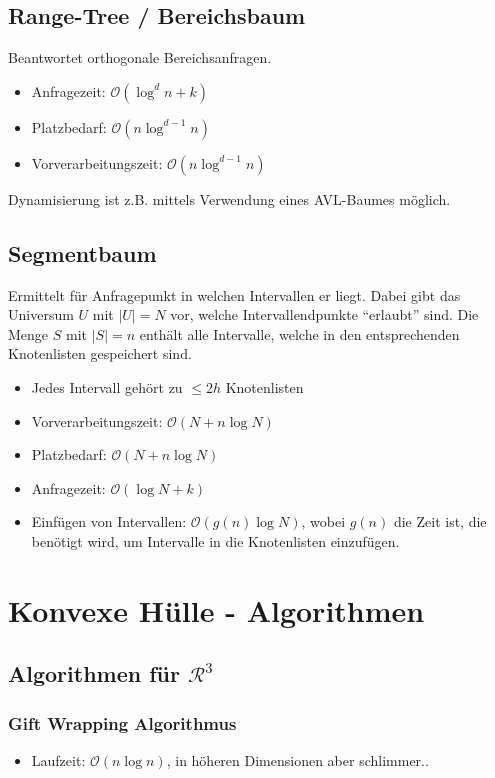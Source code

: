 \documentclass[a4paper]{article}
\begin{document}
\subsection*{Range-Tree / Bereichsbaum}
Beantwortet orthogonale Bereichsanfragen.
\begin{itemize}
	\item Anfragezeit: $\mathcal{O}(\log^d n + k)$
	\item Platzbedarf: $\mathcal{O}(n \log^{d-1} n)$
	\item Vorverarbeitungszeit: $\mathcal{O}(n \log^{d-1} n)$
\end{itemize}
Dynamisierung ist z.B. mittels Verwendung eines AVL-Baumes möglich.
\subsection*{Segmentbaum}
Ermittelt für Anfragepunkt in welchen Intervallen er liegt.
Dabei gibt das Universum $U$ mit $|U| = N$ vor, welche Intervallendpunkte "`erlaubt"' sind.
Die Menge $S$ mit $|S| = n$ enthält alle Intervalle, welche in den entsprechenden Knotenlisten
 gespeichert sind.
\begin{itemize}
	\item Jedes Intervall gehört zu $\leq 2h$ Knotenlisten
	\item Vorverarbeitungszeit: $\mathcal{O}(N + n \log N)$
	\item Platzbedarf: $\mathcal{O}(N + n \log N)$
	\item Anfragezeit: $\mathcal{O}(\log N + k)$
	\item Einfügen von Intervallen: $\mathcal{O}(g(n) \log N)$, wobei $g(n)$ die Zeit ist, die benötigt wird, um Intervalle in die Knotenlisten einzufügen.
\end{itemize}

\section*{Konvexe Hülle - Algorithmen}
\subsection*{Algorithmen für $\mathcal{R}^3$}
\subsubsection*{Gift Wrapping Algorithmus}
\begin{itemize}
	\item Laufzeit: $\mathcal{O}(n \log n)$, in höheren Dimensionen aber schlimmer..
\end{itemize}
\end{document}
